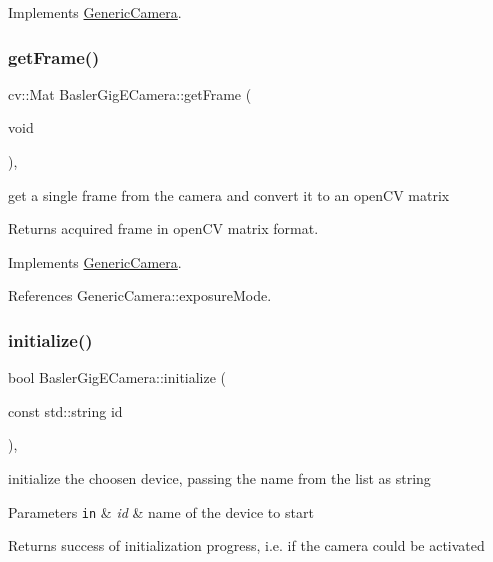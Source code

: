 Implements \hyperlink{classGenericCamera_ae3fe4b50577c854037b7a77dade27487}{Generic\+Camera}.

\mbox{\label{classBaslerGigECamera_a8e2789aa27a9b0a8075457223afa415e}} 
\subsubsection{\texorpdfstring{get\+Frame()}{getFrame()}}
{\footnotesize\ttfamily cv\+::\+Mat Basler\+Gig\+E\+Camera\+::get\+Frame (\begin{DoxyParamCaption}\item[{void}]{ }\end{DoxyParamCaption})\hspace{0.3cm}{\ttfamily [override]}, {\ttfamily [virtual]}}

get a single frame from the camera and convert it to an open\+CV matrix \begin{DoxyReturn}{Returns}
acquired frame in open\+CV matrix format. 
\end{DoxyReturn}


Implements \hyperlink{classGenericCamera_abeaa74ba34179da70ec2c4bbb9b0d793}{Generic\+Camera}.



References Generic\+Camera\+::exposure\+Mode.

\mbox{\label{classBaslerGigECamera_a1690e409075c423eec92a039781989df}} 
\subsubsection{\texorpdfstring{initialize()}{initialize()}}
{\footnotesize\ttfamily bool Basler\+Gig\+E\+Camera\+::initialize (\begin{DoxyParamCaption}\item[{const std\+::string}]{id }\end{DoxyParamCaption})\hspace{0.3cm}{\ttfamily [override]}, {\ttfamily [virtual]}}

initialize the choosen device, passing the name from the list as string 
\begin{DoxyParams}[1]{Parameters}
\mbox{\tt in}  & {\em id} & name of the device to start \\
\hline
\end{DoxyParams}
\begin{DoxyReturn}{Returns}
success of initialization progress, i.\+e. if the camera could be activated 
\end{DoxyReturn}


